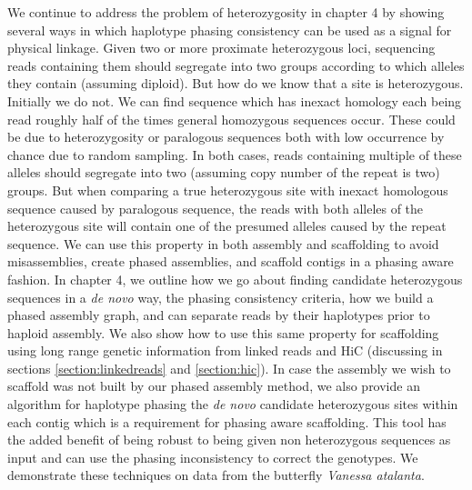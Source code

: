 \par{
We continue to address the problem of heterozygosity in chapter 4 by showing several ways in which haplotype phasing consistency can be used as a signal for physical linkage. Given two or more proximate heterozygous loci, sequencing reads containing them should segregate into two groups according to which alleles they contain (assuming diploid). But how do we know that a site is heterozygous. Initially we do not. We can find sequence which has inexact homology each being read roughly half of the times general homozygous sequences occur. These could be due to heterozygosity or paralogous sequences both with low occurrence by chance due to random sampling. In both cases, reads containing multiple of these alleles should segregate into two (assuming copy number of the repeat is two) groups. But when comparing a true heterozygous site with inexact homologous sequence caused by paralogous sequence, the reads with both alleles of the heterozygous site will contain one of the presumed alleles caused by the repeat sequence. We can use this property in both assembly and scaffolding to avoid misassemblies, create phased assemblies, and scaffold contigs in a phasing aware fashion. In chapter 4, we outline how we go about finding candidate heterozygous sequences in a \textit{de novo} way, the phasing consistency criteria, how we build a phased assembly graph, and can separate reads by their haplotypes prior to haploid assembly. We also show how to use this same property for scaffolding using long range genetic information from linked reads and HiC (discussing in sections \ref{section:linkedreads} and \ref{section:hic}). In case the assembly we wish to scaffold was not built by our phased assembly method, we also provide an algorithm for haplotype phasing the \textit{de novo} candidate heterozygous sites within each contig which is a requirement for phasing aware scaffolding. This tool has the added benefit of being robust to being given non heterozygous sequences as input and can use the phasing inconsistency to correct the genotypes. We demonstrate these techniques on data from the butterfly \textit{Vanessa atalanta}.
} 

